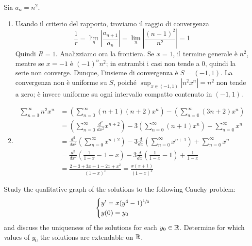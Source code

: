 \documentclass[a4paper]{article}
\begin{document}
\begin{snippetsolution}{}
    Sia \(a_n = n^2\).
    \begin{enumerate}
        \item Usando il criterio del rapporto, troviamo il raggio di convergenza
            \[
                \frac1r = \lim_n \left|\frac{a_{n+1}}{a_{n}}\right|
                = \lim_n \left|
                \frac{(n+1)^2}{n^2}
                \right| = 1
            \]
            Quindi \(R=1\).
            Analizziamo ora la frontiera.
            Se \(x=1\), il termine generale è \(n^2\), mentre se \(x=-1\) è \((-1)^nn^2\); in entrambi i casi non tende a \(0\), quindi la serie non converge.
            Dunque, l'insieme di convergenza è \(S=(-1,1)\). La convergenza non è uniforme su \(S\), poiché \(\sup_{x\in(-1,1)}|n^2x^n|=n^2\) non tende a zero; è invece uniforme su ogni intervallo compatto contenuto in \((-1,1)\).
        \item
            \begin{align*}
                \sum_{n=0}^\infty n^2x^n &=
                \left(
                    \sum_{n=0}^\infty (n+1)(n+2)x^n
                \right)
                - \left(
                    \sum_{n=0}^\infty (3n+2)x^n
                \right) \\
                &= \left(
                    \sum_{n=0}^\infty \frac{d^2}{dx^2} x^{n+2}
                \right)
                - 3\left(
                    \sum_{n=0}^\infty (n+1)x^n
                \right)
                + \sum_{n=0}^\infty x^n \\
                &= \frac{d^2}{dx^2}\left(
                    \sum_{n=0}^\infty x^{n+2}
                \right)
                - 3 \frac{d}{dx} \left(
                    \sum_{n=0}^\infty x^{n+1}
                \right) + \sum_{n=0}^\infty x^n \\
                &= \frac{d^2}{dx^2} \left(
                    \frac{1}{1-x} - 1 - x
                \right)
                - 3 \frac{d}{dx} \left(\frac{1}{1-x} - 1\right)
                + \frac{1}{1-x} \\
                &= \frac{2-3+3x + 1 - 2x + x^2}{(1-x)^3} = \frac{x(x+1)}{(1-x)^3}
            \end{align*}
    \end{enumerate}
\end{snippetsolution}

\pagebreak

\begin{radioactive}
\begin{snippetexercise}{}
    Study the qualitative graph of the solutions to the following Cauchy problem:
    \[
        \begin{cases}
            y' = x(y^4 - 1)^{\sfrac13} \\
            y(0) = y_0
        \end{cases}
    \]
    and discuss the uniqueness of the solutions for each \(y_0 \in \mathbb{R}\).
    Determine for which values of \(y_0\) the solutions are extendable on \(\mathbb{R}\).
\end{snippetexercise}
\end{radioactive}
\end{document}
